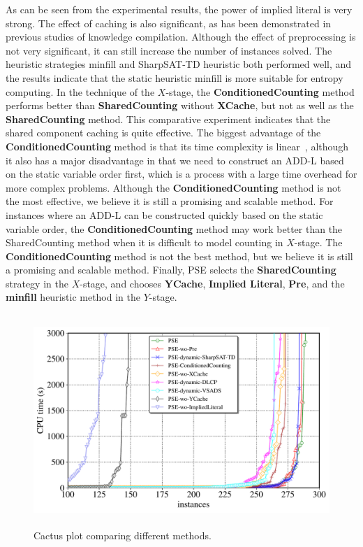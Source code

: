 As can be seen from the experimental results, the power of implied literal is very strong. 
The effect of caching is also significant, as has been demonstrated in previous studies of knowledge compilation.
Although the effect of preprocessing is not very significant, it can still increase the number of instances solved.
The heuristic strategies minfill and SharpSAT-TD heuristic both performed well, and the results indicate that the static heuristic minfill is more suitable for entropy computing.
In the technique of the $X$-stage, the \textbf{ConditionedCounting} method performs better than \textbf{SharedCounting} without \textbf{XCache}, but not as well as the \textbf{SharedCounting} method.
This comparative experiment indicates that the shared component caching is quite effective.
The biggest advantage of the \textbf{ConditionedCounting} method is that its time complexity is linear~\cite{lai2017new}, although it also has a major disadvantage in that we need to construct an ADD-L based on the static variable order first, which is a process with a large time overhead for more complex problems.
Although the \textbf{ConditionedCounting} method is not the most effective, we believe it is still a promising and scalable method. 
For instances where an ADD-L can be constructed quickly based on the static variable order, the \textbf{ConditionedCounting} method may work better than the SharedCounting method when it is difficult to model counting in $X$-stage. 
The \textbf{ConditionedCounting} method is not the best method, but we believe it is still a promising and scalable method.
Finally, PSE selects the \textbf{SharedCounting} strategy in the $X$-stage, and chooses \textbf{YCache}, \textbf{Implied Literal}, \textbf{Pre}, and the \textbf{minfill} heuristic method in the $Y$-stage.
	
\begin{figure}[htbp]
	\centering
	\includegraphics[width=12cm,height=8cm]{figures/Configuration_compare.pdf}
	\caption{Cactus plot comparing different methods.}
	\label{figure:3}
\end{figure} 


